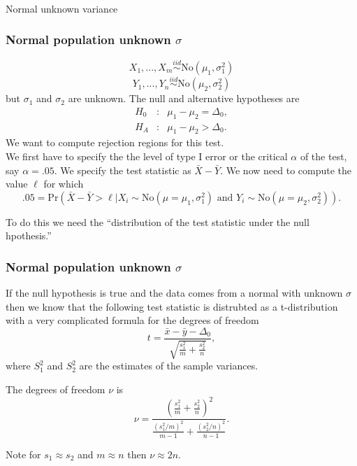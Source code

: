 \begin{frame}[fragile]\frametitle{}
\begin{center}
{\Large Normal unknown variance}

\end{center}
\end{frame}





\begin{frame}[fragile]\frametitle{Normal population unknown $\sigma$}

{\tiny

$$X_1,...,X_m \stackrel{iid}{\sim} \mbox{No}(\mu_1,\sigma_1^2)$$
$$Y_1,...,Y_n \stackrel{iid}{\sim} \mbox{No}(\mu_2,\sigma_2^2)$$
but $\sigma_1$ and $\sigma_2$ are unknown.
The null and alternative hypotheses are
\begin{eqnarray*}
H_0&:& \mu_1 - \mu_2 = \Delta_0, \\
H_A&:& \mu_1 -  \mu_2 > \Delta_0.
\end{eqnarray*}
We want to compute rejection regions for this test. \\
We first have to specify the the level of type I error
or the critical $\alpha$ of the test, say $\alpha =.05$.
We specify the test statistic as $\bar{X}-\bar{Y}$. We now
need to compute the value $\ell$ for which
$$.05 = \mbox{Pr}(\bar{X}-\bar{Y} > \ell | X_i \sim
\mbox{No}(\mu=\mu_1,\sigma_1^2) \mbox{ and } Y_i \sim
\mbox{No}(\mu=\mu_2,\sigma_2^2)).$$

To do this we need the ``distribution of the test statistic under the
null hpothesis.''

 }
\end{frame}


\begin{frame}[fragile]\frametitle{Normal population unknown $\sigma$}

{\tiny

If the null hypothesis is true and the data comes from
a normal with unknown $\sigma$ then we know that the following
test statistic is distrubted as a t-distribution with a very
complicated formula for the degrees of freedom
$$t = \frac{\bar{x}-\bar{y}-\Delta_0}{\sqrt{\frac{s_1^2}{m}+\frac{s_2^2}{n}}},$$
where $S_1^2$ and $S_2^2$ are the estimates of the sample variances.
 
The degrees of freedom $\nu$ is
$$\nu = \frac{\left(\frac{s_1^2}{m}+\frac{s_2^2}{n}\right)^2}{\frac{(s_1^2/m)^2}{m-1}+\frac{(s_2^2/n)^2}{n-1}}.$$

Note for $s_1 \approx s_2$ and $m \approx n$ then $\nu \approx 2n$.
}

\end{frame}




